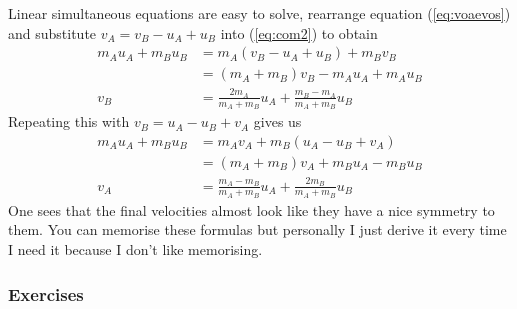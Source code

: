 \documentclass{article}
\begin{document}
Linear simultaneous equations are easy to solve, rearrange equation (\ref{eq:voaevos}) and substitute $v_A = v_B - u_A + u_B$ into (\ref{eq:com2}) to obtain
\begin{align}
    m_A u_A + m_B u_B &= m_A (v_B - u_A + u_B) + m_B v_B \\
    &= (m_A + m_B) v_B - m_A u_A + m_A u_B \\
    v_B &= \frac{2m_A}{m_A + m_B} u_A + \frac{m_B - m_A}{m_A + m_B} u_B 
\end{align}
Repeating this with $v_B = u_A - u_B + v_A$ gives us 
\begin{align}
    m_A u_A + m_B u_B &= m_A v_A + m_B (u_A - u_B + v_A) \\
    &= (m_A + m_B) v_A + m_B u_A - m_B u_B \\
    v_A &= \frac{m_A - m_B}{m_A + m_B} u_A + \frac{2m_B}{m_A + m_B} u_B
\end{align}
One sees that the final velocities almost look like they have a nice symmetry to them. You can memorise these formulas but personally I just derive it every time I need it because I don't like memorising.
\subsubsection{Exercises}
\end{document}
